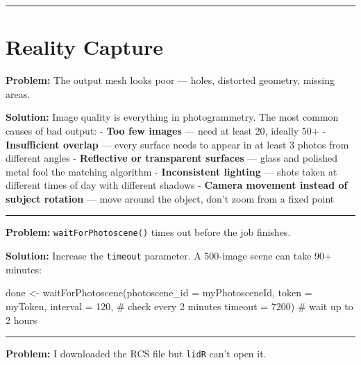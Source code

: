 \documentclass[
  11pt,
  letterpaper,
  DIV=11,
  numbers=noendperiod]{scrreprt}
\newenvironment{Shaded}{\begin{snugshade}}{\end{snugshade}}
\newcommand{\AttributeTok}[1]{\textcolor[rgb]{0.40,0.45,0.13}{#1}}
\newcommand{\CommentTok}[1]{\textcolor[rgb]{0.37,0.37,0.37}{#1}}
\newcommand{\DecValTok}[1]{\textcolor[rgb]{0.68,0.00,0.00}{#1}}
\newcommand{\FunctionTok}[1]{\textcolor[rgb]{0.28,0.35,0.67}{#1}}
\newcommand{\NormalTok}[1]{\textcolor[rgb]{0.00,0.23,0.31}{#1}}
\newcommand{\OtherTok}[1]{\textcolor[rgb]{0.00,0.23,0.31}{#1}}
\begin{document}
\begin{center}\rule{0.5\linewidth}{0.5pt}\end{center}

\section{Reality Capture}\label{reality-capture-2}

\textbf{Problem:} The output mesh looks poor --- holes, distorted
geometry, missing areas.

\textbf{Solution:} Image quality is everything in photogrammetry. The
most common causes of bad output: - \textbf{Too few images} --- need at
least 20, ideally 50+ - \textbf{Insufficient overlap} --- every surface
needs to appear in at least 3 photos from different angles -
\textbf{Reflective or transparent surfaces} --- glass and polished metal
fool the matching algorithm - \textbf{Inconsistent lighting} --- shots
taken at different times of day with different shadows - \textbf{Camera
movement instead of subject rotation} --- move around the object, don't
zoom from a fixed point

\begin{center}\rule{0.5\linewidth}{0.5pt}\end{center}

\textbf{Problem:} \texttt{waitForPhotoscene()} times out before the job
finishes.

\textbf{Solution:} Increase the \texttt{timeout} parameter. A 500-image
scene can take 90+ minutes:

\begin{Shaded}
\begin{Highlighting}[]
\NormalTok{done }\OtherTok{\textless{}{-}} \FunctionTok{waitForPhotoscene}\NormalTok{(}\AttributeTok{photoscene\_id =}\NormalTok{ myPhotosceneId,}
                           \AttributeTok{token         =}\NormalTok{ myToken,}
                           \AttributeTok{interval      =} \DecValTok{120}\NormalTok{,   }\CommentTok{\# check every 2 minutes}
                           \AttributeTok{timeout       =} \DecValTok{7200}\NormalTok{)  }\CommentTok{\# wait up to 2 hours}
\end{Highlighting}
\end{Shaded}

\begin{center}\rule{0.5\linewidth}{0.5pt}\end{center}

\textbf{Problem:} I downloaded the RCS file but \texttt{lidR} can't open
it.
\end{document}
